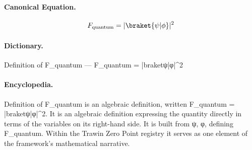 \paragraph{Canonical Equation.}
\[
F_{\text{quantum}} = |\braket{\psi|\phi}|^2
\]

\paragraph{Dictionary.}
Definition of F\_quantum — F\_quantum = |braketψ|φ|\textasciicircum{}2

\paragraph{Encyclopedia.}
Definition of F\_quantum is an algebraic definition, written F\_quantum = |braketψ|φ|\textasciicircum{}2. It is an algebraic definition expressing the quantity directly in terms of the variables on its right-hand side. It is built from ψ, φ, defining F\_quantum. Within the Trawin Zero Point registry it serves as one element of the framework's mathematical narrative.
